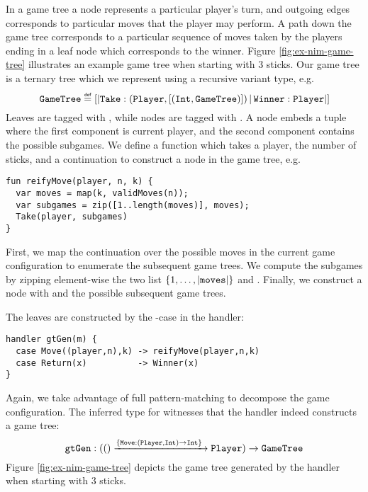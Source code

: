 \begin{example}\label{ex:nim-game-tree}
In a game tree a node represents a particular player's turn, and outgoing edges corresponds to particular moves that the player may perform. A path down the game tree corresponds to a particular sequence of moves taken by the players ending in a leaf node which corresponds to the winner. Figure \ref{fig:ex-nim-game-tree} illustrates an example game tree when starting with 3 sticks. Our game tree is a ternary tree which we represent using a recursive variant type, e.g.
\[ \type{GameTree} \defas [|\type{Take}:(\type{Player},[(\type{Int},\type{GameTree})])\,|\,\type{Winner}:\type{Player}|] \]
Leaves are tagged with , while nodes are tagged with . A  node embeds a tuple where the first component is current player, and the second component contains the possible subgames.
We define a function  which takes a player, the number of sticks, and a continuation to construct a node in the game tree, e.g.
\begin{lstlisting}[style=links]
fun reifyMove(player, n, k) {
  var moves = map(k, validMoves(n));
  var subgames = zip([1..length(moves)], moves);
  Take(player, subgames)
}
\end{lstlisting}
First, we map the continuation over the possible moves in the current game configuration to enumerate the subsequent game trees. We compute the subgames by zipping element-wise the two list $\{1,\dots,|\code{moves}|\}$ and . Finally, we construct a node  with  and the possible subsequent game trees.

The leaves are constructed by the -case in the handler:
\begin{lstlisting}[style=links]
handler gtGen(m) {
  case Move((player,n),k) -> reifyMove(player,n,k)
  case Return(x)          -> Winner(x)
}
\end{lstlisting}
Again, we take advantage of full pattern-matching to decompose the game configuration. The inferred type for  witnesses that the handler indeed constructs a game tree:
\[ \code{gtGen} : (() \xrightarrow{\{\type{Move}:(\type{Player},\type{Int}) \to \type{Int}\}\;} \type{Player}) \to \type{GameTree} \]
Figure \ref{fig:ex-nim-game-tree} depicts the game tree generated by the handler when starting with 3 sticks.
\begin{figure}[H]
\begin{center}
\begin{tikzpicture}[level distance=1.5cm,
level 1/.style={sibling distance=3.5cm},
level 2/.style={sibling distance=2cm}]


\end{tikzpicture}
\end{center}
\end{figure}
\end{example}

